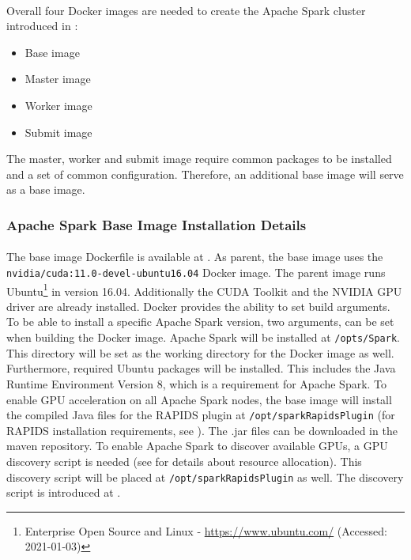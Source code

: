 \paragraph{}Overall four Docker images are needed to create the Apache Spark cluster introduced in :
\begin{itemize}
\item Base image
\item Master image
\item Worker image
\item Submit image
\end{itemize}
The master, worker and submit image require common packages to be installed and a set of common configuration. Therefore, an additional base image will serve as a base image.

\subsubsection{Apache Spark Base Image Installation Details}
\paragraph{}The base image Dockerfile is available at .
As parent, the base image uses the \texttt{nvidia/cuda:11.0-devel-ubuntu16.04} Docker image. The parent image runs Ubuntu\footnote{Enterprise Open Source and Linux - \url{https://www.ubuntu.com/} (Accessed: 2021-01-03)} in version 16.04. Additionally the CUDA Toolkit and the NVIDIA GPU driver are already installed.
Docker provides the ability to set build arguments. To be able to install a specific Apache Spark version, two arguments,  can be set when building the Docker image.
Apache Spark will be installed at \texttt{/opts/Spark}.
This directory will be set as the working directory for the Docker image as well.
Furthermore, required Ubuntu packages will be installed. This includes the Java Runtime Environment Version 8, which is a requirement for Apache Spark.
To enable GPU acceleration on all Apache Spark nodes, the base image will install the compiled Java files for the RAPIDS plugin at \texttt{/opt/sparkRapidsPlugin} (for RAPIDS installation requirements, see ). The .jar files can be downloaded in the maven repository.
To enable Apache Spark to discover available GPUs, a GPU discovery script is needed (see  for details about resource allocation). This discovery script will be placed at \texttt{/opt/sparkRapidsPlugin} as well. The discovery script is introduced at .

